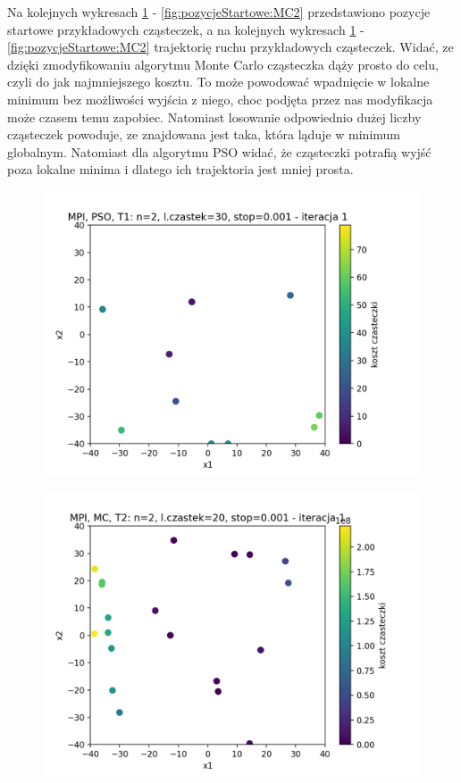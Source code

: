 \documentclass[11pt, a4paper, oneside]{article}
\begin{document}
Na kolejnych wykresach \ref{fig:pozycjeStartowe:PSO1} - \ref{fig:pozycjeStartowe:MC2} przedstawiono pozycje startowe przykładowych cząsteczek, a na kolejnych wykresach   \ref{fig:pozycjeStartowe:PSO1} - \ref{fig:pozycjeStartowe:MC2} trajektorię ruchu przykładowych cząsteczek. Widać, ze dzięki zmodyfikowaniu algorytmu Monte Carlo cząsteczka dąży prosto do celu, czyli do jak najmniejszego kosztu. To może powodować wpadnięcie w lokalne minimum bez możliwości wyjścia z niego, choc podjęta przez nas modyfikacja może czasem temu zapobiec. Natomiast losowanie odpowiednio dużej liczby cząsteczek powoduje, ze znajdowana jest taka, która ląduje w minimum globalnym. Natomiast dla algorytmu PSO widać, że cząsteczki potrafią wyjść poza lokalne minima i dlatego ich trajektoria jest mniej prosta.


\begin{figure}[H]
\centering
\begin{minipage}[b]{\dimexpr.5\textwidth-1em}
  \centering
  \includegraphics[width=1\linewidth]{grafiki2/MPI_PSO_T1/MPI_PSO_T1_startPositions.png}
  \label{fig:pozycjeStartowe:PSO1}
\end{minipage} \hfill
\begin{minipage}[b]{\dimexpr.5\textwidth-1em}
  \centering
  \includegraphics[width=1\linewidth]{grafiki2/MPI_MC_T2/MPI_MC_T2_startPositions.png}

\end{minipage}
\end{figure}
\end{document}
